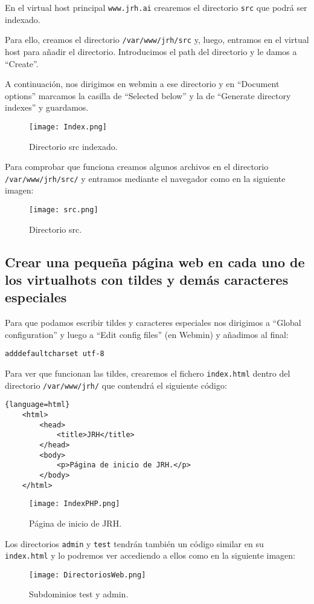 \documentclass[12pt,letterpaper]{article}
\begin{document}
En el virtual host principal \texttt{www.jrh.ai} crearemos el directorio \texttt{src} que podrá ser indexado.

Para ello, creamos el directorio \texttt{/var/www/jrh/src} y, luego, entramos en el virtual host para añadir el directorio. Introducimos el path del directorio y le damos a ``Create''.

A continuación, nos dirigimos en webmin a ese directorio y en ``Document options'' marcamos la casilla de ``Selected below'' y la de ``Generate directory indexes'' y guardamos.

\begin{figure}[h]
	\centering
	\texttt{[image: Index.png]}
	\caption{Directorio src indexado.}
	\label{Directorio src indexado}
\end{figure}

Para comprobar que funciona creamos algunos archivos en el directorio \texttt{/var/www/jrh/src/} y entramos mediante el navegador como en la siguiente imagen:
\newpage
\begin{figure}[h]
	\centering
	\texttt{[image: src.png]}
	\caption{Directorio src.}
	\label{Directorio src}
\end{figure}


\subsection{Crear una pequeña página web en cada uno de los virtualhots con tildes y demás caracteres especiales}
Para que podamos escribir tildes y caracteres especiales nos dirigimos a ``Global configuration'' y luego a ``Edit config files'' (en Webmin) y añadimos al final:
\begin{center}
	\texttt{adddefaultcharset utf-8}
\end{center}

Para ver que funcionan las tildes, crearemos el fichero \texttt{index.html} dentro del directorio \texttt{/var/www/jrh/} que contendrá el siguiente código:
\begin{lstlisting}{language=html}
	<html>
		<head>
			<title>JRH</title>
		</head>
		<body>
			<p>Página de inicio de JRH.</p>
		</body>
	</html>
\end{lstlisting}
\newpage
\begin{figure}[h]
	\centering
	\texttt{[image: IndexPHP.png]}
	\caption{Página de inicio de JRH.}
	\label{Pagina de inicip de JRH}
\end{figure}

Los directorios \texttt{admin} y \texttt{test} tendrán también un código similar en su \texttt{index.html} y lo podremos ver accediendo a ellos como en la siguiente imagen:
\begin{figure}[h]
	\centering
	\texttt{[image: DirectoriosWeb.png]}
	\caption{Subdominios test y admin.}
	\label{Directorios test y admin}
\end{figure}
\end{document}
